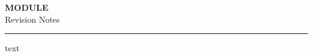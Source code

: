 \documentclass[12pt]{article}
\newcommand{\modulename}{MODULE}
\newcommand{\lecturers}{LECTURERS}
\newcommand{\academicyear}{XXXX-XX}
\newcommand{\makeassignmentheader}{
\begin{center}
    {\LARGE \textbf{\modulename}} \\[4pt]
    {\large Revision Notes} \\[6pt] 
\end{center}
\vspace{10pt}
\hrule
\vspace{10pt}
}
\begin{document}
\thispagestyle{firstpage}
\pagestyle{otherpages}

\makeassignmentheader

\begin{abstract}
\noindent These notes are a summary of the \modulename \  module taught by \lecturers \ in \academicyear. There will be minimal, if any, proofs as these notes focus on the main results of the course for revision purposes. If you do find any errors or typos, feel free to let me know at \textcolor{gray}{davidpuertamaths@gmail.com}
\end{abstract}

\tableofcontents

\newpage

text
\end{document}
